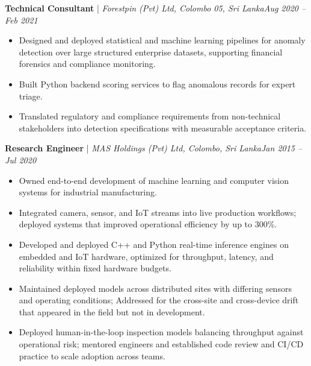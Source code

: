\documentclass[11pt]{article}
\newenvironment{cvrole}[5]{%
  \par\noindent\textbf{\large #1} | \textit{\small #2, #3}\hfill \textit{\small #4 -- #5}\par
  \begin{itemize}[leftmargin=2em, itemsep=-0.3em, topsep=-0.5em]%
}{%
  \end{itemize}\par\noindent\mbox{}\par\vspace{0.1em}%
}
\begin{document}
\begin{cvrole}{Technical Consultant}{Forestpin (Pvt) Ltd}{Colombo 05, Sri Lanka}{Aug 2020}{Feb 2021}
    \item Designed and deployed statistical and machine learning pipelines for anomaly detection over large structured enterprise datasets, supporting financial forensics and compliance monitoring.
    \item Built Python backend scoring services to flag anomalous records for expert triage.
    \item Translated regulatory and compliance requirements from non-technical stakeholders into detection specifications with measurable acceptance criteria.
\end{cvrole}

\begin{cvrole}{Research Engineer}{MAS Holdings (Pvt) Ltd}{Colombo, Sri Lanka}{Jan 2015}{Jul 2020}
    \item Owned end-to-end development of machine learning and computer vision systems for industrial manufacturing. 
    \item Integrated camera, sensor, and IoT streams into live production workflows; deployed systems that improved operational efficiency by up to 300\%.
    \item Developed and deployed C++ and Python real-time inference engines on embedded and IoT hardware, optimized for throughput, latency, and reliability within fixed hardware budgets.
    \item Maintained deployed models across distributed sites with differing sensors and operating conditions; Addressed for the cross-site and cross-device drift that appeared in the field but not in development.
    \item Deployed human-in-the-loop inspection models balancing throughput against operational risk; mentored engineers and established code review and CI/CD practice to scale adoption across teams.
\end{cvrole}

\end{document}
